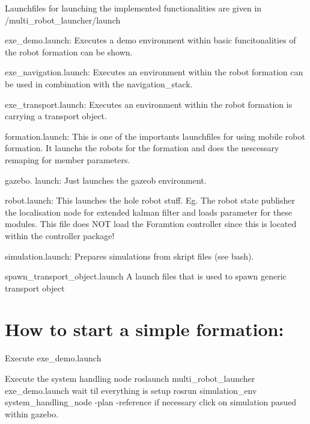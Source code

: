 Launchfiles for launching the implemented functionalities are given in /multi\+\_\+robot\+\_\+launcher/launch
\begin{DoxyEnumerate}
\item exe\+\_\+demo.\+launch\+: Executes a demo environment within basic funcitonalities of the robot formation can be shown.
\item exe\+\_\+navigation.\+launch\+: Executes an environment within the robot formation can be used in combination with the navigation\+\_\+stack.
\item exe\+\_\+transport.\+launch\+: Executes an environment within the robot formation is carrying a transport object.
\item formation.\+launch\+: This is one of the importants launchfiles for using mobile robot formation. It launchs the robots for the formation and does the nescessary remaping for member parameters.
\item gazebo. launch\+: Just launches the gazeob environment.
\item robot.\+launch\+: This launches the hole robot stuff. Eg. The robot state publisher the localisation node for extended kalman filter and loads parameter for these modules. This file does N\+OT load the Foramtion controller since this is located within the controller package!
\item simulation.\+launch\+: Prepares simulations from skript files (see bash).
\item spawn\+\_\+transport\+\_\+object.\+launch A launch files that is used to spawn generic transport object
\end{DoxyEnumerate}

\section*{How to start a simple formation\+:}


\begin{DoxyEnumerate}
\item Execute exe\+\_\+demo.\+launch
\item Execute the system handling node {\ttfamily roslaunch multi\+\_\+robot\+\_\+launcher exe\+\_\+demo.\+launch} wait til everything is setup {\ttfamily rosrun simulation\+\_\+env system\+\_\+handling\+\_\+node -\/plan -\/reference} if necessary click on simulation pasued within gazebo. 
\end{DoxyEnumerate}